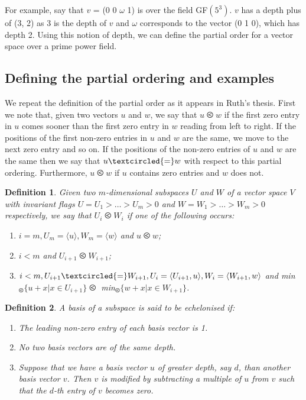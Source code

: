 \documentclass[12pt]{report}
\newtheorem{definition}{Definition}[section]
\begin{document}
For example, say that $v$ = (0 0 $\omega$ 1) is over the field GF$(5^3)$. $v$ has a depth plus of (3, 2) as 3 is the depth of $v$ and $\omega$ corresponds to the vector (0 1 0), which has depth 2. Using this notion of depth, we can define the partial order for a vector space over a prime power field.

\subsection{Defining the partial ordering and examples}

We repeat the definition of the partial order as it appears in Ruth's thesis. First we note that, given two vectors $u$ and $w$, we say that $u \olessthan w$ if the first zero entry in $u$ comes sooner than the first zero entry in $w$ reading from left to right. If the positions of the first non-zero entries in $u$ and $w$ are the same, we move to the next zero entry and so on. If the positions of the non-zero entries of $u$ and $w$ are the same then we say that $u \textcircled{=} w$ with respect to this partial ordering. Furthermore, $u \olessthan w$ if $u$ contains zero entries and $w$ does not.

\begin{definition}
Given two $m$-dimensional subspaces $U$ and $W$ of a vector space $V$ with invariant flags $U = U_1 > \ldots > U_m > 0$ and $W = W_1 > \ldots > W_m > 0$ respectively, we say that $U_i \olessthan W_i$ if one of the following occurs:

\begin{enumerate}
	\item $i = m, U_m = \langle u \rangle, W_m = \langle w \rangle$ and $u \olessthan w$;
	\item $i < m$ and $U_{i+1} \olessthan W_{i+1}$;
	\item $i < m, U_{i+1} \textcircled{=} W_{i+1}, U_i = \langle U_{i+1}, u \rangle, W_i = \langle W_{i+1}, w \rangle$ and min$_\olessthan \{u + x|x \in U_{i+1}\} \olessthan $ min$_\olessthan \{w + x|x \in W_{i+1}\}$.
\end{enumerate}

\end{definition}

\begin{definition}
A basis of a subspace is said to be echelonised if:

\begin{enumerate}
\item The leading non-zero entry of each basis vector is 1.
\item No two basis vectors are of the same depth.
\item Suppose that we have a basis vector $u$ of greater depth, say $d$, than another basis vector $v$. Then $v$ is modified by subtracting a multiple of $u$ from $v$ such that the $d$-th entry of $v$ becomes zero.
\end{enumerate}

\end{definition}
\end{document}
